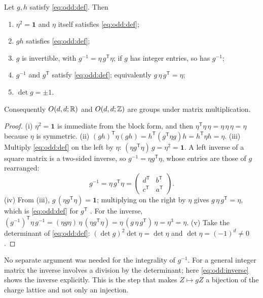 \begin{proposition}\label{prop:odd:group}
Let $g,h$ satisfy \eqref{eq:odd:def}. Then
\begin{enumerate}[label=(\roman*),itemsep=1pt]
\item $\eta^2=\mathbf 1$ and $\eta$ itself satisfies \eqref{eq:odd:def};
\item $gh$ satisfies \eqref{eq:odd:def};
\item $g$ is invertible, with $g^{-1}=\eta\,g^{\mathsf T}\eta$; if $g$ has integer entries,
 so has $g^{-1}$;
\item $g^{-1}$ and $g^{\mathsf T}$ satisfy \eqref{eq:odd:def}; equivalently
 $g\,\eta\,g^{\mathsf T}=\eta$;
\item $\det g=\pm1$.
\end{enumerate}
Consequently $O(d,d;\mathbb{R})$ and $O(d,d;\mathbb{Z})$ are groups under matrix multiplication.
\end{proposition}
\begin{proof}
(i) $\eta^2=\mathbf 1$ is immediate from the block form, and then
$\eta^{\mathsf T}\eta\,\eta=\eta\,\eta\,\eta=\eta$ because $\eta$ is symmetric.
(ii) $(gh)^{\mathsf T}\eta(gh)=h^{\mathsf T}(g^{\mathsf T}\eta g)h=h^{\mathsf T}\eta h=\eta$.
(iii) Multiply \eqref{eq:odd:def} on the left by $\eta$:
$(\eta g^{\mathsf T}\eta)\,g=\eta^2=\mathbf 1$. A left inverse of a square matrix is a
two-sided inverse, so $g^{-1}=\eta g^{\mathsf T}\eta$, whose entries are those of $g$
rearranged:
\begin{equation}\label{eq:odd:inverse}
 g^{-1}=\eta\,g^{\mathsf T}\eta=\begin{pmatrix}d^{\mathsf T}&b^{\mathsf T}\\
 c^{\mathsf T}&a^{\mathsf T}\end{pmatrix}.
\end{equation}
(iv) From (iii), $g\,(\eta g^{\mathsf T}\eta)=\mathbf 1$; multiplying on the right by
$\eta$ gives $g\,\eta\,g^{\mathsf T}=\eta$, which is \eqref{eq:odd:def} for $g^{\mathsf T}$
. For the inverse,
$(g^{-1})^{\mathsf T}\eta\,g^{-1}=(\eta g\eta)\,\eta\,(\eta g^{\mathsf T}\eta)
=\eta\,(g\,\eta\,g^{\mathsf T})\,\eta=\eta^3=\eta$.
(v) Take the determinant of \eqref{eq:odd:def}: $(\det g)^2\det\eta=\det\eta$ and
$\det\eta=(-1)^d\neq0$.
\end{proof}

No separate argument was needed for the integrality of $g^{-1}$. For a general integer
matrix the inverse involves a division by the determinant; here \eqref{eq:odd:inverse}
shows the inverse explicitly. This is the step that makes $Z\mapsto gZ$ a bijection of the
charge lattice and not only an injection.

